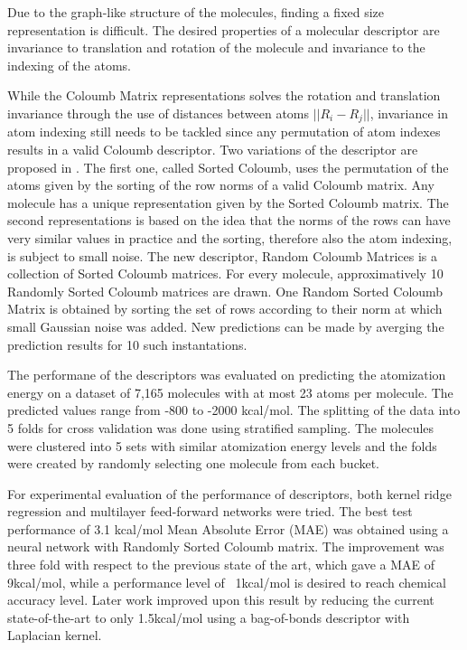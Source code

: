 \documentclass[10pt,journal,a4paper]{IEEEtran}
\begin{document}
Due to the graph-like structure of the molecules, finding a fixed size representation is difficult. The desired properties of a molecular descriptor are invariance to translation and rotation of the molecule and invariance to the indexing of the atoms.

While the Coloumb Matrix representations solves the rotation and translation invariance through the use of distances between atoms $||R_i -R_j||$, invariance in atom indexing still needs to be tackled since any permutation of atom indexes results in a valid Coloumb descriptor.
Two variations of the descriptor are proposed in \cite{montavon2012learning}. The first one, called Sorted Coloumb, uses the permutation of the atoms given by the sorting of the row norms of a valid Coloumb matrix. Any molecule has a unique representation given by the Sorted Coloumb matrix. The second representations is based on the idea that the norms of the rows can have very similar values in practice and the sorting, therefore also the atom indexing, is subject to small noise. The new descriptor, Random Coloumb Matrices is a collection of Sorted Coloumb matrices. For every molecule, approximatively 10 Randomly Sorted Coloumb matrices are drawn. One Random Sorted Coloumb Matrix is obtained by sorting the set of  rows according to their norm at which small Gaussian noise was added. New predictions can be made by averging the prediction results for 10 such instantations.

The performane of the descriptors was evaluated on predicting the atomization energy on a dataset of 7,165 molecules with at most 23 atoms per molecule. The predicted values range from -800 to -2000 kcal/mol. The splitting of the data into 5 folds for cross validation was done using stratified sampling. The molecules were clustered into 5 sets with similar atomization energy levels and the folds were created by randomly selecting one molecule from each bucket.

For experimental evaluation of the performance of descriptors, both kernel ridge regression and multilayer feed-forward networks were tried. The best test performance of 3.1 kcal/mol Mean Absolute Error (MAE) was obtained using a neural network with
 Randomly Sorted Coloumb matrix. The improvement was three fold with respect to the previous state of the art, which gave a MAE of 9kcal/mol, while a performance level of ~1kcal/mol is desired to reach chemical accuracy level.
Later work \cite{bob} improved upon this result by reducing the current state-of-the-art to only 1.5kcal/mol using a bag-of-bonds descriptor with Laplacian kernel.
\end{document}
